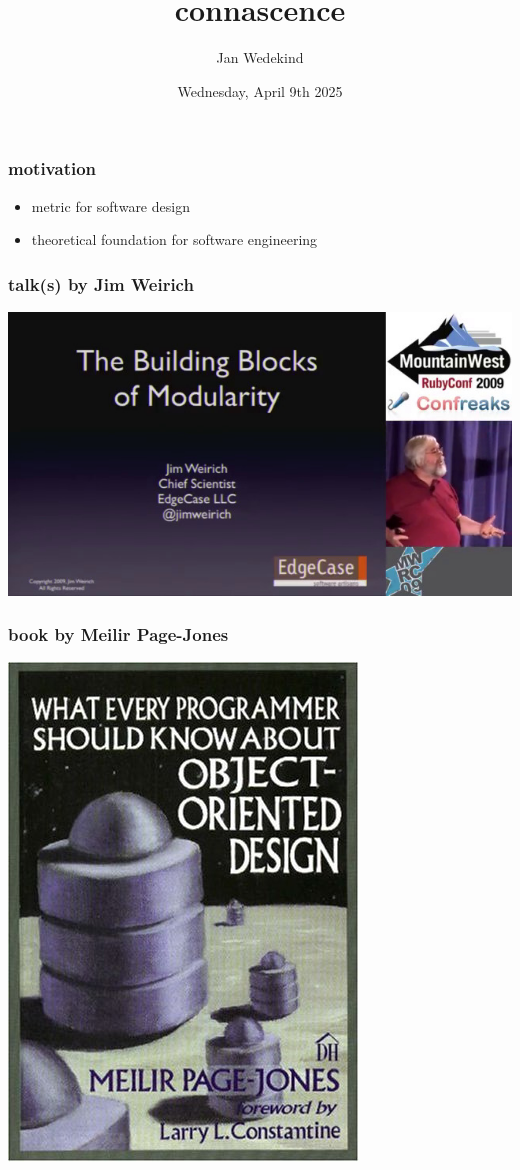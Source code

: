 \documentclass[aspectratio=169,12pt,xcolor=dvipsnames]{beamer}
\title{\Huge connascence}
\author{Jan Wedekind}
\date{Wednesday, April 9th 2025}
\begin{document}
\frame{\titlepage}

\begin{frame}
  \frametitle{motivation}
  \begin{itemize}
    \item metric for software design
    \item theoretical foundation for software engineering
  \end{itemize}
\end{frame}

\begin{frame}
  \frametitle{talk(s) by Jim Weirich}
  \begin{center}
    \href{https://www.youtube.com/watch?v=q85rdBMe9GY}{\includegraphics[height=.8\textheight]{weirich}}
  \end{center}
\end{frame}

\begin{frame}
  \frametitle{book by Meilir Page-Jones}
  \begin{center}
    \includegraphics[height=.8\textheight]{meilir}
  \end{center}
\end{frame}
\end{document}
